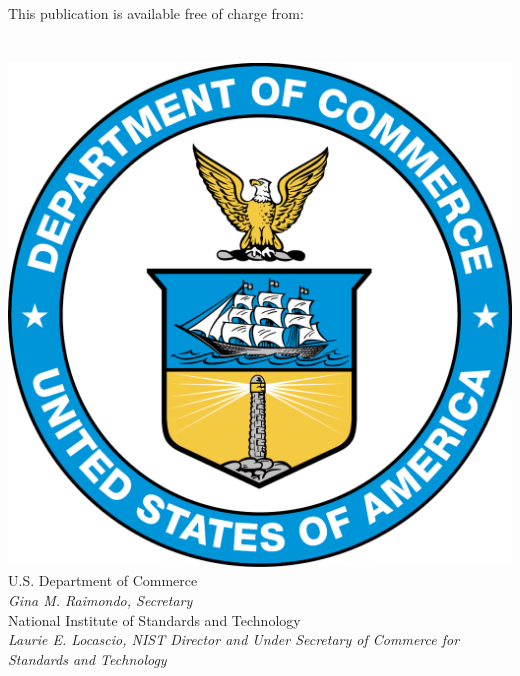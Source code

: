 \begin{titlepage}
\begin{flushright}
\vfill
\normalsize This publication is available free of charge from:\\
\DOI\\
\vfill
\normalsize \pubmonth~\pubyear\\
\vfill
\includegraphics[width=0.2\linewidth]{DoC-logo.pdf}\\
 \vfill
\footnotesize U.S. Department of Commerce\\ 
\textit{Gina M. Raimondo, Secretary}\\
\vspace{10pt}
National Institute of Standards and Technology\\ 
\hspace*{-3cm}\textit{Laurie E. Locascio, NIST Director and Under Secretary of Commerce for Standards and Technology}
\end{flushright}
\end{titlepage}
